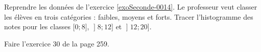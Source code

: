 
\begin{exercice}\label{exosmath-0535}

    Reprendre les données de l'exercice \ref{exoSeconde-0014}. Le professeur veut classer les élèves en trois catégories : faibles, moyens et forts. Tracer l'histogramme des notes pour les classes \( \mathopen[ 0 ;8 \mathclose]\), \( \mathopen] 8 ; 12 \mathclose]\) et \( \mathopen] 12;20 \mathclose]\).

    Faire l'exercice 30 de la page 259.

\end{exercice}
